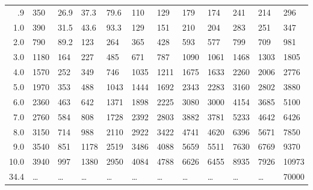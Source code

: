 \documentclass[12pt,oneside]{book}[2021/10/04]
\begin{document}
\begin{table}
\begin{tabular}{|d|j{4.0}|g|g|g|g|g|g|g|g|g|g|}
.9 &     350 & 26.9 &  37.3 &  79.6 &   110 &   129 &   179 &   174 &   241 &   214 &    296 \\
1.0 &    390 & 31.5 &  43.6 &  93.3 &   129 &   151 &   210 &   204 &   283 &   251 &    347 \\
2.0 &    790 & 89.2 &   123 &   264 &   365 &   428 &   593 &   577 &   799 &   709 &    981 \\
3.0 &   1180 &  164 &   227 &   485 &   671 &   787 &  1090 &  1061 &  1468 &  1303 &   1805 \\
4.0 &   1570 &  252 &   349 &   746 &  1035 &  1211 &  1675 &  1633 &  2260 &  2006 &   2776 \\
5.0 &   1970 &  353 &   488 &  1043 &  1444 &  1692 &  2343 &  2283 &  3160 &  2802 &   3880 \\
6.0 &   2360 &  463 &   642 &  1371 &  1898 &  2225 &  3080 &  3000 &  4154 &  3685 &   5100 \\
7.0 &   2760 &  584 &   808 &  1728 &  2392 &  2803 &  3882 &  3781 &  5233 &  4642 &   6426 \\
8.0 &   3150 &  714 &   988 &  2110 &  2922 &  3422 &  4741 &  4620 &  6396 &  5671 &   7850 \\
9.0 &   3540 &  851 &  1178 &  2519 &  3486 &  4088 &  5659 &  5511 &  7630 &  6769 &   9370 \\
10.0 &  3940 &  997 &  1380 &  2950 &  4084 &  4788 &  6626 &  6455 &  8935 &  7926 &  10973 \\
34.4 &  \dots & \dots & \dots & \dots & \dots & \dots & \dots & \dots & \dots & \dots & 70000 \\
\hline
\end{tabular}
\end{table}
\normalsize
\end{document}
